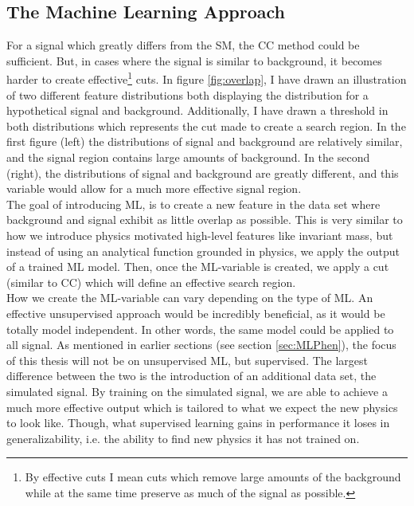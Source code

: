 \subsection{The Machine Learning Approach}
For a signal which greatly differs from the \ac{SM}, the \ac{CC} method could be sufficient. But, in 
cases where the signal is similar to background, it becomes harder to create effective\footnote{By effective
cuts I mean cuts which remove large amounts of the background while at the same time preserve as much of 
the signal as possible.} cuts. In figure \ref{fig:overlap}, I have drawn an illustration of two different feature distributions both 
displaying the distribution for a hypothetical signal and background. Additionally, I have drawn a 
threshold in both distributions which represents the cut made to create a search region. In the first 
figure (left) the distributions of signal and background are relatively similar, and the signal region 
contains large amounts of background. In the second (right), the distributions of signal and background 
are greatly different, and this variable would allow for a much more effective signal region. 
\\
The goal of introducing \ac{ML}, is to create a new feature in the data set where background and signal
exhibit as little overlap as possible. This is very similar to how we introduce physics motivated high-level
features like invariant mass, but instead of using an analytical function grounded in physics, 
we apply the output of a trained \ac{ML} model. Then, once the \ac{ML}-variable is created, 
we apply a cut (similar to \ac{CC}) which will define an effective search region. 
\\
How we create the \ac{ML}-variable can vary depending on the type of \ac{ML}. An effective unsupervised approach
would be incredibly beneficial, as it would be totally model independent. In other words, the same model could be applied 
to all signal. As mentioned in earlier sections (see section \ref{sec:MLPhen}), the focus of this thesis will not be on 
unsupervised \ac{ML}, but supervised. The largest difference between the two is the introduction of an additional data set,
the simulated signal. By training on the simulated signal, we are able to achieve a much more 
effective output which is tailored to what we expect the new physics to look like. Though, what supervised learning gains in performance
it loses in generalizability, i.e. the ability to find new physics it has not trained on.